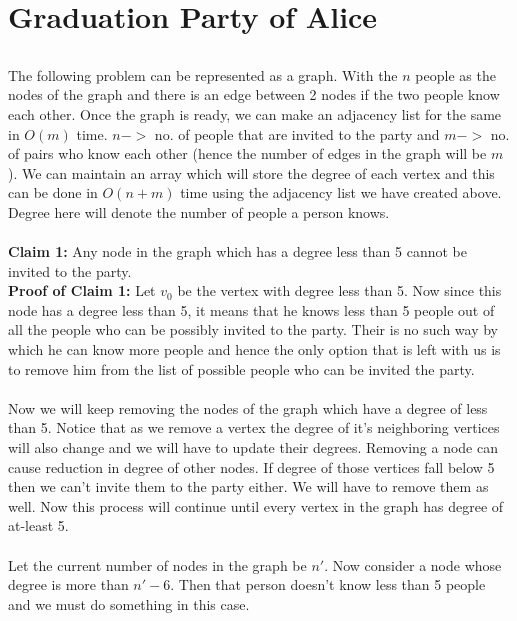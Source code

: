\documentclass{article}
\begin{document}
\section{Graduation Party of Alice}

\subsection{}
The following problem can be represented as a graph. With the $n$ people as the nodes of the graph and there is an edge between 2 nodes if the two people know each other. Once the graph is ready, we can make an adjacency list for the same in $O(m)$ time. $n->$ no. of people that are invited to the party and $m->$ no. of pairs who know each other (hence the number of edges in the graph will be $m$). We can maintain an array which will store the degree of each vertex and this can be done in $O(n+m)$ time using the adjacency list we have created above. Degree here will denote the number of people a person knows.
\\\\
\textbf{Claim 1:} Any node in the graph which has a degree less than 5 cannot be invited to the party.\\
\textbf{Proof of Claim 1:} Let $v_0$ be the vertex with degree less than 5. Now since this node has a degree less than 5, it means that he knows less than 5 people out of all the people who can be possibly invited to the party. Their is no such way by which he can know more people and hence the only option that is left with us is to remove him from the list of possible people who can be invited the party.
\\\\
Now we will keep removing the nodes of the graph which have a degree of less than 5. Notice that as we remove a vertex the degree of it's neighboring vertices will also change and we will have to update their degrees. Removing a node can cause reduction in degree of other nodes. If degree of those vertices fall below 5 then we can't invite them to the party either. We will have to remove them as well. Now this process will continue until every vertex in the graph has degree of at-least 5.
\\\\
Let the current number of nodes in the graph be $n'$. Now consider a node whose degree is more than $n'-6$. Then that person doesn't know less than 5 people and we must do something in this case. 
\\\\
\end{document}
